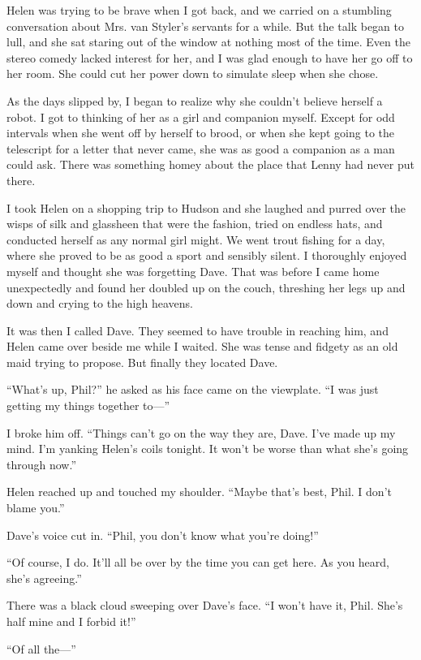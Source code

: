 \documentclass{article}
\begin{document}
Helen was trying to be brave when I got back, and we carried on a stumbling conversation about Mrs. van Styler’s servants for a while. But the talk began to lull, and she sat staring out of the window at nothing most of the time. Even the stereo comedy lacked interest for her, and I was glad enough to have her go off to her room. She could cut her power down to simulate sleep when she chose.

As the days slipped by, I began to realize why she couldn’t believe herself a robot. I got to thinking of her as a girl and companion myself. Except for odd intervals when she went off by herself to brood, or when she kept going to the telescript for a letter that never came, she was as good a companion as a man could ask. There was something homey about the place that Lenny had never put there.

I took Helen on a shopping trip to Hudson and she laughed and purred over the wisps of silk and glassheen that were the fashion, tried on endless hats, and conducted herself as any normal girl might. We went trout fishing for a day, where she proved to be as good a sport and sensibly silent. I thoroughly enjoyed myself and thought she was forgetting Dave. That was before I came home unexpectedly and found her doubled up on the couch, threshing her legs up and down and crying to the high heavens.

It was then I called Dave. They seemed to have trouble in reaching him, and Helen came over beside me while I waited. She was tense and fidgety as an old maid trying to propose. But finally they located Dave.

“What’s up, Phil?” he asked as his face came on the viewplate. “I was just getting my things together to—”

I broke him off. “Things can’t go on the way they are, Dave. I’ve made up my mind. I’m yanking Helen’s coils tonight. It won’t be worse than what she’s going through now.”

Helen reached up and touched my shoulder. “Maybe that’s best, Phil. I don’t blame you.”

Dave’s voice cut in. “Phil, you don’t know what you’re doing!”

“Of course, I do. It’ll all be over by the time you can get here. As you heard, she’s agreeing.”

There was a black cloud sweeping over Dave’s face. “I won’t have it, Phil. She’s half mine and I forbid it!”

“Of all the—”
\end{document}
